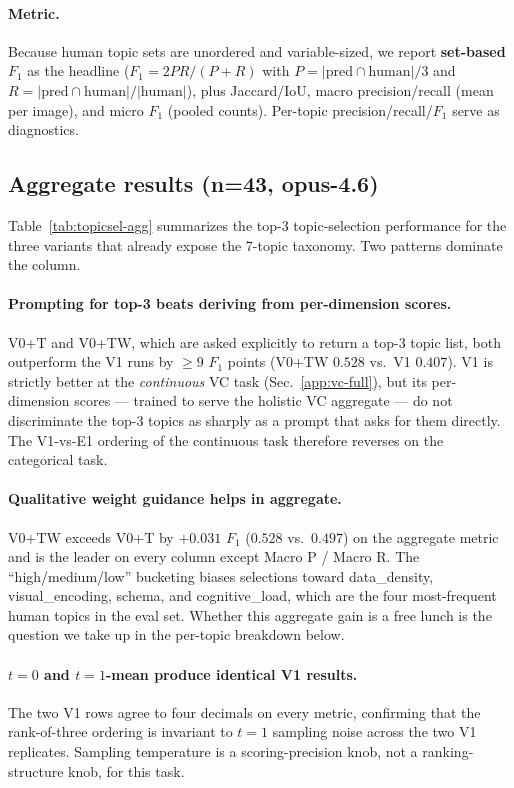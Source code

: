 \paragraph{Metric.} Because human topic sets are unordered and
variable-sized, we report \textbf{set-based $F_1$} as the headline
($F_1 = 2PR/(P+R)$ with $P = |\text{pred} \cap \text{human}| / 3$ and
$R = |\text{pred} \cap \text{human}| / |\text{human}|$), plus
Jaccard/IoU, macro precision/recall (mean per image), and micro $F_1$
(pooled counts). Per-topic precision/recall/$F_1$ serve as
diagnostics.

\subsection{Aggregate results (n=43, opus-4.6)}

Table~\ref{tab:topicsel-agg} summarizes the top-3 topic-selection
performance for the three variants that already expose the 7-topic
taxonomy. Two patterns dominate the column.

\paragraph{Prompting for top-3 beats deriving from per-dimension
scores.} V0+T and V0+TW, which are asked explicitly to return a
top-3 topic list, both outperform the V1 runs by $\geq 9$ $F_1$
points (V0+TW $0.528$ vs.\ V1 $0.407$). V1 is strictly better at
the \emph{continuous} VC task (Sec.~\ref{app:vc-full}), but its
per-dimension scores --- trained to serve the holistic VC aggregate
--- do not discriminate the top-3 topics as sharply as a prompt
that asks for them directly. The V1-vs-E1 ordering of the
continuous task therefore reverses on the categorical task.

\paragraph{Qualitative weight guidance helps in aggregate.}
V0+TW exceeds V0+T by $+0.031$ $F_1$ ($0.528$ vs.\ $0.497$) on the
aggregate metric and is the leader on every column except Macro P /
Macro R. The ``high/medium/low'' bucketing biases selections toward
data\_density, visual\_encoding, schema, and cognitive\_load, which
are the four most-frequent human topics in the eval set. Whether
this aggregate gain is a free lunch is the question we take up in
the per-topic breakdown below.

\paragraph{$t=0$ and $t=1$-mean produce identical V1 results.}
The two V1 rows agree to four decimals on every metric, confirming
that the rank-of-three ordering is invariant to $t=1$ sampling
noise across the two V1 replicates. Sampling temperature is a
scoring-precision knob, not a ranking-structure knob, for this
task.

